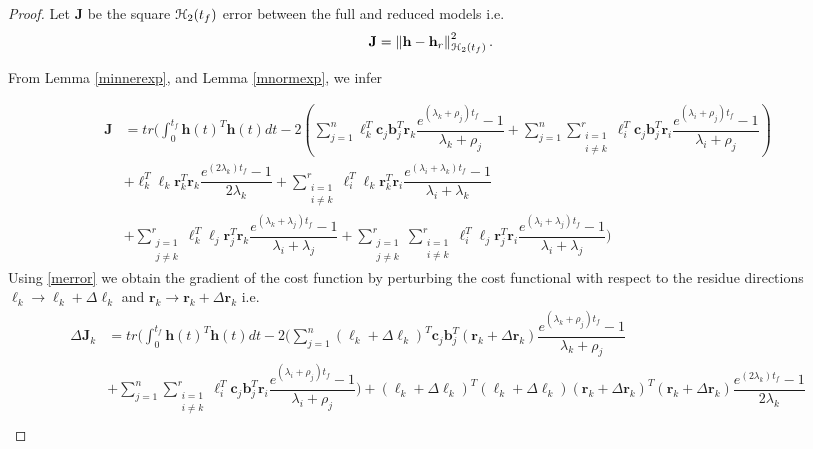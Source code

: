 \documentclass[preprint]{elsarticle}
\theoremstyle{definition}
\theoremstyle{definition}
\def\mathcal{\EuScript}
\numberwithin{equation}{section}
\newcommand{\J}{\mathbf{J}}
\newcommand{\h}{\mathbf{h}}
\newcommand{\tf}{t_f}
\newcommand{\rc}{\boldsymbol{r}}
\newcommand{\lc}{\boldsymbol{\ell}}
\newcommand{\cc}{\boldsymbol{c}}
\newcommand{\bb}{\boldsymbol{b}}
\newcommand{\ch}{\mathcal{H}}
\newcommand{\norm}[1]{\left\lVert#1\right\rVert}
\begin{document}
\begin{proof}
 Let $\J$ be the square $\ch_2({\tf})$ error between the full and reduced models i.e.
\begin{align*}
\J&=\norm{\h -\h_r}^2_{\ch_2({\tf})}.
\end{align*}



From Lemma \ref{minnerexp}, and Lemma \ref{mnormexp}, we infer

\begin{equation} \label{merror}
\begin{aligned}
\J&=tr \Bigg(\int_0^{\tf}\h(t)^T\h(t) dt-2 \left(\sum_{j=1}^n\lc_{k}^T\cc_j\bb_j^T\rc_{k}\dfrac{e^{(\lambda_k+\rho_j){\tf}}-1}{\lambda_k+\rho_j}
+\sum_{j=1}^n\sum_{\substack{i=1\\i\neq k}}^r\lc_{i}^T\cc_j\bb_j^T\rc_{i}\dfrac{e^{(\lambda_i+\rho_j){\tf}}-1}{\lambda_i+\rho_j}\right)\\
&+ \lc_{k}^T\lc_{k}\rc_{k}^T\rc_{k}\dfrac{e^{(2\lambda_k){\tf}}-1}{2\lambda_k}
+\sum_{\substack{i=1 \\i \neq k}}^r\lc_{i}^T\lc_{k}\rc_{k}^T\rc_{i}\dfrac{e^{(\lambda_i+\lambda_k){\tf}}-1}{\lambda_i+\lambda_k}\\
&+\sum_{\substack{j=1\\j\neq k}}^r\lc_{k}^T\lc_{j}\rc_{j}^T\rc_{k}\dfrac{e^{(\lambda_k+\lambda_j){\tf}}-1}{\lambda_i+\lambda_j}+\sum_{\substack{j=1\\j\neq k}}^r\sum_{\substack{i=1\\i\neq k}}^r\lc_{i}^T\lc_{j}\rc_{j}^T\rc_{i}\dfrac{e^{(\lambda_i+\lambda_j){\tf}}-1}{\lambda_i+\lambda_j}\Bigg) 
\end{aligned}
\end{equation}
Using \eqref{merror} we obtain the gradient of the cost function by perturbing the cost functional with respect to the residue directions $\lc_k\to \lc_k+\Delta\lc_k$ and $\rc_k\to \rc_k+\Delta\rc_k$ i.e. 
\begin{align*}
\Delta\J_k&=tr\Bigg(\int_0^{\tf}\h(t)^T\h(t) dt-2\bigg( \sum_{j=1}^n(\lc_{k}+\Delta\lc_{k})^T\cc_j\bb_j^T(\rc_{k}+\Delta\rc_{k})\dfrac{e^{(\lambda_k+\rho_j){\tf}}-1}{\lambda_k+\rho_j}\\
&+\sum_{j=1}^n\sum_{\substack{i=1\\i\neq k}}^r\lc_{i}^T\cc_j\bb_j^T\rc_{i}\dfrac{e^{(\lambda_i+\rho_j){\tf}}-1}{\lambda_i+\rho_j}\bigg)+ (\lc_{k}+\Delta\lc_{k})^T(\lc_{k}+\Delta\lc_{k})(\rc_{k}+\Delta\rc_{k})^T(\rc_{k}+\Delta\rc_{k})\dfrac{e^{(2\lambda_k){\tf}}-1}{2\lambda_k}\\

\end{align*}
\end{proof}
\end{document}
